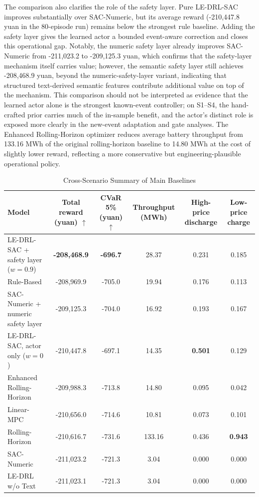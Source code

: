 \documentclass{ieeeaccess}
\begin{document}
The comparison also clarifies the role of the safety layer. Pure LE-DRL-SAC improves substantially over SAC-Numeric, but its average reward (-210,447.8 yuan in the 80-episode run) remains below the strongest rule baseline. Adding the safety layer gives the learned actor a bounded event-aware correction and closes this operational gap. Notably, the numeric safety layer already improves SAC-Numeric from -211,023.2 to -209,125.3 yuan, which confirms that the safety-layer mechanism itself carries value; however, the semantic safety layer still achieves -208,468.9 yuan, beyond the numeric-safety-layer variant, indicating that structured text-derived semantic features contribute additional value on top of the mechanism. This comparison should not be interpreted as evidence that the learned actor alone is the strongest known-event controller; on S1--S4, the hand-crafted prior carries much of the in-sample benefit, and the actor's distinct role is exposed more clearly in the new-event adaptation and gate analyses. The Enhanced Rolling-Horizon optimizer reduces average battery throughput from 133.16 MWh of the original rolling-horizon baseline to 14.80 MWh at the cost of slightly lower reward, reflecting a more conservative but engineering-plausible operational policy.

\begin{table}[t!]
\caption{Cross-Scenario Summary of Main Baselines}
\label{tab:baseline_summary}
\centering
\begin{tabular}{lccccc}
\toprule
\textbf{Model} & \textbf{Total reward (yuan)} $\uparrow$ & \textbf{CVaR 5\% (yuan)} $\uparrow$ & \textbf{Throughput (MWh)} & \textbf{High-price discharge} & \textbf{Low-price charge} \\
\midrule
LE-DRL-SAC + safety layer ($w=0.9$) & \textbf{-208,468.9} & \textbf{-696.7} & 28.37 & 0.231 & 0.185 \\
Rule-Based & -208,969.9 & -705.0 & 19.94 & 0.176 & 0.113 \\
SAC-Numeric + numeric safety layer & -209,125.3 & -704.0 & 16.92 & 0.193 & 0.167 \\
LE-DRL-SAC, actor only ($w=0$) & -210,447.8 & -697.1 & 14.35 & \textbf{0.501} & 0.129 \\
Enhanced Rolling-Horizon & -209,988.3 & -713.8 & 14.80 & 0.095 & 0.042 \\
Linear-MPC & -210,656.0 & -714.6 & 10.81 & 0.073 & 0.101 \\
Rolling-Horizon & -210,616.7 & -731.6 & 133.16 & 0.436 & \textbf{0.943} \\
SAC-Numeric & -211,023.2 & -721.3 & 3.04 & 0.000 & 0.000 \\
LE-DRL w/o Text & -211,023.1 & -721.3 & 3.04 & 0.000 & 0.000 \\
\bottomrule
\end{tabular}
\end{table}
\end{document}
